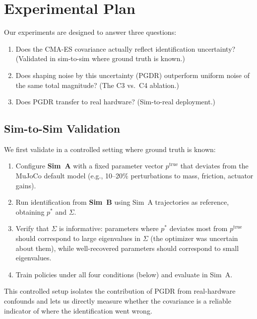 \documentclass[10pt,twocolumn]{article}
\begin{document}
\section{Experimental Plan}
\label{sec:experiments}

Our experiments are designed to answer three questions:
\begin{enumerate}
    \item Does the CMA-ES covariance actually reflect identification uncertainty? (Validated in sim-to-sim where ground truth is known.)
    \item Does shaping noise by this uncertainty (PGDR) outperform uniform noise of the same total magnitude? (The C3 vs.\ C4 ablation.)
    \item Does PGDR transfer to real hardware? (Sim-to-real deployment.)
\end{enumerate}

\subsection{Sim-to-Sim Validation}

We first validate in a controlled setting where ground truth is known:
\begin{enumerate}
    \item Configure \textbf{Sim~A} with a fixed parameter vector $p^{\mathrm{true}}$ that deviates from the MuJoCo default model (e.g., 10--20\% perturbations to mass, friction, actuator gains).
    \item Run identification from \textbf{Sim~B} using Sim~A trajectories as reference, obtaining $p^*$ and $\Sigma$.
    \item Verify that $\Sigma$ is informative: parameters where $p^*$ deviates most from $p^{\mathrm{true}}$ should correspond to large eigenvalues in $\Sigma$ (the optimizer was uncertain about them), while well-recovered parameters should correspond to small eigenvalues.
    \item Train policies under all four conditions (below) and evaluate in Sim~A.
\end{enumerate}

This controlled setup isolates the contribution of PGDR from real-hardware confounds and lets us directly measure whether the covariance is a reliable indicator of where the identification went wrong.
\end{document}
